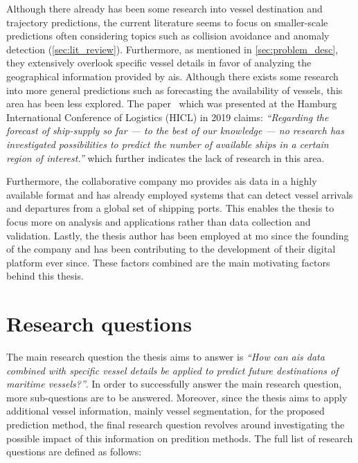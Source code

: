 Although there already has been some research into vessel destination and trajectory predictions, the current literature seems to focus on smaller-scale predictions often considering topics such as collision avoidance and anomaly detection (\cref{sec:lit_review}). Furthermore, as mentioned in \cref{sec:problem_desc}, they extensively overlook specific vessel details in favor of analyzing the geographical information provided by \acrshort{ais}. Although there exists some research into more general predictions such as forecasting the availability of vessels, this area has been less explored. The paper~\cite{lechtenberg2019} which was presented at the Hamburg International Conference of Logistics (HICL) in 2019 claims: \textit{“Regarding the forecast of ship-supply so far --- to the best of our knowledge --- no research has investigated possibilities to predict the number of available ships in a certain region of interest.”} which further indicates the lack of research in this area.

Furthermore, the collaborative company \acrfull{mo} provides \acrshort{ais} data in a highly available format and has already employed systems that can detect vessel arrivals and departures from a global set of shipping ports. This enables the thesis to focus more on analysis and applications rather than data collection and validation. Lastly, the thesis author has been employed at \acrshort{mo} since the founding of the company and has been contributing to the development of their digital platform ever since. These factors combined are the main motivating factors behind this thesis.

\section{Research questions}
\label{sec:research_questions}

The main research question the thesis aims to answer is \textit{``How can \acrshort{ais} data combined with specific vessel details be applied to predict future destinations of maritime vessels?''}. In order to successfully answer the main research question, more sub-questions are to be answered. Moreover, since the thesis aims to apply additional vessel information, mainly vessel segmentation, for the proposed prediction method, the final research question revolves around investigating the possible impact of this information on predition methods. The full list of research questions are defined as follows:

